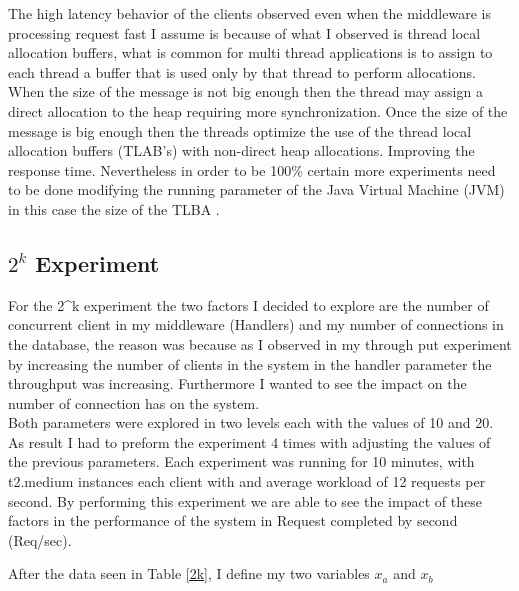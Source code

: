 The high latency behavior of the clients observed even when the middleware is processing request fast I assume is because of what I observed is thread local allocation buffers, what is common for multi thread applications is to assign to each thread a buffer that is used only by that thread to perform allocations. When the size of the message is not big enough then the thread may assign a direct allocation to the heap requiring more synchronization. Once the size of the message is big enough then the threads optimize the use of the thread local allocation buffers (TLAB’s) with non-direct heap allocations. Improving the response time. Nevertheless in order to be 100\% certain more experiments need to be done modifying the running parameter of the Java Virtual Machine (JVM) in this case the size of the TLBA \cite{oracle}.


\subsection{$2^k$ Experiment}\label{sec:k-experiment}
For the 2\^{}k experiment the two factors I decided to explore are the number of concurrent client in my middleware (Handlers) and my number of connections in the database, the reason was because as I observed in my through put experiment by increasing the number of clients in the system in the handler parameter the throughput was increasing. Furthermore I wanted to see the impact on the number of connection has on the system.\\

Both parameters were explored in two levels each with the values of 10 and 20. As result I had to preform the experiment 4 times with adjusting the values of the previous parameters. Each experiment was running for 10 minutes, with t2.medium instances each client with and average workload of 12 requests per second.
By performing this experiment we are able to see the impact of these factors in the performance of the system in Request completed by second (Req/sec).

After the data seen in Table \ref{2k}, I define my two variables $x_{a}$ and $x_{b}$



\begin{table}[h]\centering
         \caption{Throughput metric results for different settings of the $2^k $ experiment}
         \label{2k}
 \end{table}  
 
